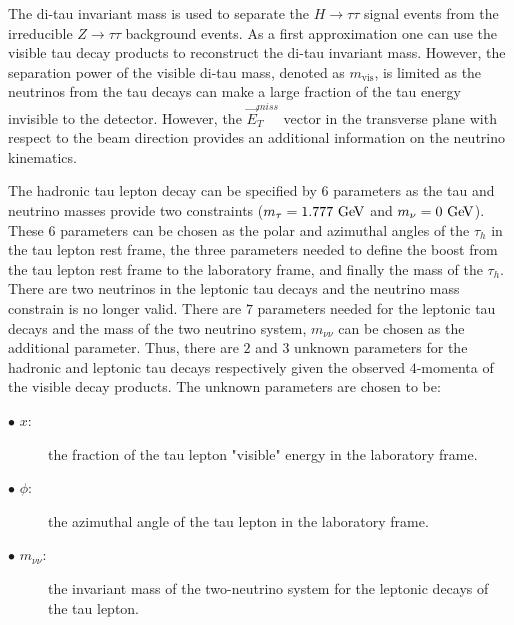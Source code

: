 The di-tau invariant mass is used to separate the $H \rightarrow \tau\tau$ signal events from the irreducible $Z\rightarrow\tau\tau$ background events. As a first approximation one can use the visible tau decay products to reconstruct the di-tau invariant mass. However, the separation power of the visible di-tau mass, denoted as $m_{\mathrm{vis}}$, is limited as the  neutrinos from the tau decays can make a large fraction of the tau energy invisible to the detector. However, the $\vec{E}_{T}^{miss}$ vector in the transverse plane with respect to the beam direction provides an additional information on the neutrino kinematics. 

The hadronic tau lepton decay can be specified by $6$ parameters as the tau and neutrino masses provide two constraints ($m_{\tau}=1.777~\mathrm{Ge\kern -0.1em V}$ and $m_{\nu}=0~\mathrm{Ge\kern -0.1em V}$). These $6$ parameters can be chosen as the polar and azimuthal angles of the $\tau_h$ in the tau lepton rest frame, the three parameters needed to define the boost from the tau lepton rest frame to the laboratory frame, and finally the  mass of the $\tau_h$. There are two neutrinos in the leptonic tau decays and the neutrino mass constrain is no longer valid. There are $7$ parameters needed for the leptonic tau decays and the mass of the two neutrino system, $m_{\nu\nu}$ can be chosen as the additional parameter.  Thus, there are $2$ and $3$ unknown parameters for the hadronic and leptonic tau decays respectively given the observed $4$-momenta of the visible decay products. The unknown parameters are chosen to be:

\begin{description}
\item[$\bullet$ $x$:] the fraction of the tau lepton "visible" energy in the laboratory frame.
\item[$\bullet$ $\phi$:] the azimuthal angle of the tau lepton in the laboratory frame.
\item[$\bullet$ $m_{\nu\nu}$:] the invariant mass of the two-neutrino system for the leptonic decays of the tau lepton. 
\end{description}

